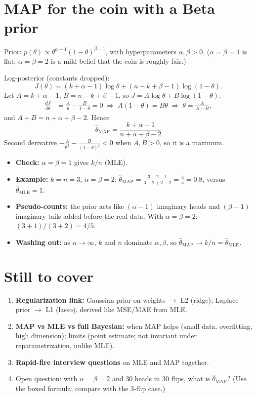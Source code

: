 \documentclass[11pt,a4paper]{article}
\begin{document}
\section{MAP for the coin with a Beta prior}
Prior: $p(\theta)\propto\theta^{\alpha-1}(1-\theta)^{\beta-1}$, with hyperparameters $\alpha,\beta>0$. ($\alpha=\beta=1$ is flat; $\alpha=\beta=2$ is a mild belief that the coin is roughly fair.)

Log-posterior (constants dropped):
\[
J(\theta)=(k+\alpha-1)\log\theta+(n-k+\beta-1)\log(1-\theta).
\]
Let $A=k+\alpha-1$, $B=n-k+\beta-1$, so $J=A\log\theta+B\log(1-\theta)$.
\begin{align*}
\frac{dJ}{d\theta}&=\frac A\theta-\frac B{1-\theta}=0
\;\Rightarrow\;A(1-\theta)=B\theta
\;\Rightarrow\;\theta=\frac{A}{A+B},
\end{align*}
and $A+B=n+\alpha+\beta-2$. Hence
\[
\boxed{\hat\theta_{\text{MAP}}=\frac{k+\alpha-1}{n+\alpha+\beta-2}}
\]
Second derivative $-\frac{A}{\theta^2}-\frac{B}{(1-\theta)^2}<0$ when $A,B>0$, so it is a maximum.

\begin{itemize}[nosep]
  \item \textbf{Check:} $\alpha=\beta=1$ gives $k/n$ (MLE).
  \item \textbf{Example:} $k=n=3$, $\alpha=\beta=2$: $\hat\theta_{\text{MAP}}=\frac{3+2-1}{3+2+2-2}=\frac45=0.8$, versus $\hat\theta_{\text{MLE}}=1$.
  \item \textbf{Pseudo-counts:} the prior acts like $(\alpha-1)$ imaginary heads and $(\beta-1)$ imaginary tails added before the real data. With $\alpha=\beta=2$: $(3+1)/(3+2)=4/5$.
  \item \textbf{Washing out:} as $n\to\infty$, $k$ and $n$ dominate $\alpha,\beta$, so $\hat\theta_{\text{MAP}}\to k/n=\hat\theta_{\text{MLE}}$.
\end{itemize}

\section{Still to cover}
\begin{enumerate}[nosep]
  \item \textbf{Regularization link:} Gaussian prior on weights $\to$ L2 (ridge); Laplace prior $\to$ L1 (lasso), derived like MSE/MAE from MLE.
  \item \textbf{MAP vs MLE vs full Bayesian:} when MAP helps (small data, overfitting, high dimension); limits (point estimate; not invariant under reparametrization, unlike MLE).
  \item \textbf{Rapid-fire interview questions} on MLE and MAP together.
  \item Open question: with $\alpha=\beta=2$ and 30 heads in 30 flips, what is $\hat\theta_{\text{MAP}}$? (Use the boxed formula; compare with the 3-flip case.)
\end{enumerate}
\end{document}
